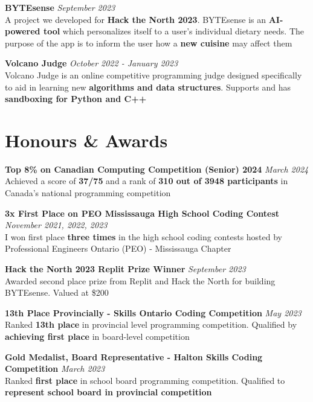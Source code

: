 \documentclass[a4paper,10pt]{article}
\begin{document}
\textbf{BYTEsense} \hfill \textit{September 2023}\\
A project we developed for \textbf{Hack the North 2023}. BYTEsense is an \textbf{AI-powered tool} which personalizes itself to a user's individual dietary needs. The purpose of the app is to inform the user how a \textbf{new cuisine} may affect them

\medskip

\textbf{Volcano Judge} \hfill \textit{October 2022 - January 2023}\\
Volcano Judge is an online competitive programming judge designed specifically to aid in learning new \textbf{algorithms and data structures}. Supports and has \textbf{sandboxing for Python and C++}

\section*{Honours \& Awards}
\textbf{Top 8\% on Canadian Computing Competition (Senior) 2024} \hfill \textit{March 2024}\\
Achieved a score of \textbf{37/75} and a rank of \textbf{310 out of 3948 participants} in Canada's national programming competition

\medskip

\textbf{3x First Place on PEO Mississauga High School Coding Contest} \hfill \textit{November 2021, 2022, 2023}\\
I won first place \textbf{three times} in the high school coding contests hosted by Professional Engineers Ontario (PEO) - Mississauga Chapter

\medskip

\textbf{Hack the North 2023 Replit Prize Winner} \hfill \textit{September 2023}\\
Awarded second place prize from Replit and Hack the North for building BYTEsense. Valued at \$200

\medskip

\textbf{13th Place Provincially - Skills Ontario Coding Competition} \hfill \textit{May 2023}\\
Ranked \textbf{13th place} in provincial level programming competition. Qualified by \textbf{achieving first place} in board-level competition

\medskip

\textbf{Gold Medalist, Board Representative - Halton Skills Coding Competition} \hfill \textit{March 2023}\\
Ranked \textbf{first place} in school board programming competition. Qualified to \textbf{represent school board in provincial competition}
\end{document}
